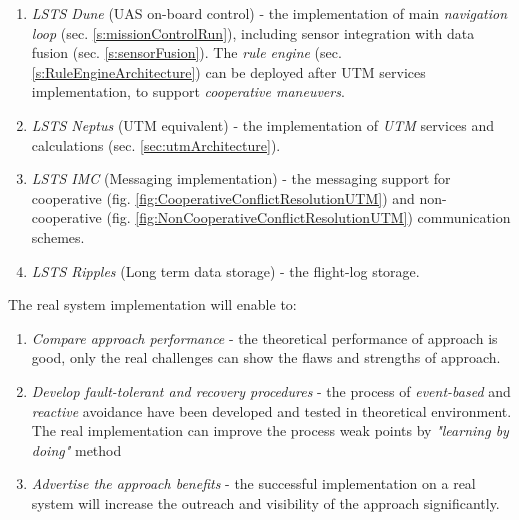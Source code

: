 \begin{enumerate}
    \item \emph{LSTS Dune} (UAS on-board control) - the implementation of main \emph{navigation loop} (sec. \ref{s:missionControlRun}), including sensor integration with data fusion (sec. \ref{s:sensorFusion}). The \emph{rule engine} (sec. \ref{s:RuleEngineArchitecture}) can be deployed after UTM services implementation, to support \emph{cooperative maneuvers}.
    
    \item \emph{LSTS Neptus} (UTM equivalent) - the implementation of \emph{UTM} services and calculations (sec. \ref{sec:utmArchitecture}).
    
    \item \emph{LSTS IMC} (Messaging implementation) -  the messaging support for cooperative (fig. \ref{fig:CooperativeConflictResolutionUTM}) and non-cooperative (fig. \ref{fig:NonCooperativeConflictResolutionUTM}) communication schemes.
    
    \item \emph{LSTS Ripples} (Long term data storage) -  the flight-log storage.
    
\end{enumerate}

\noindent The real system implementation will enable to:
\begin{enumerate}
    \item \emph{Compare approach performance} - the theoretical performance of approach is good, only the real challenges can show the flaws and strengths of approach. 
    
    \item \emph{Develop fault-tolerant and recovery procedures} - the process of \emph{event-based} and \emph{reactive} avoidance have been developed and tested in theoretical environment. The real implementation can improve the process weak points by \emph{"learning by doing"} method
    
    \item \emph{Advertise the approach benefits} - the successful implementation on a real system will increase the outreach and visibility of the approach significantly.
\end{enumerate}